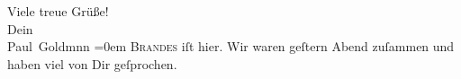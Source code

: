\begin{ledgroupsized}[t]{13cm}
           \pstart
           Viele treue Grüße! {\\[\baselineskip]}Dein {\\[\baselineskip]}\spacefill\mbox{Paul Goldmnn}\pend
           \leftskip=0em{}\pstart
           \noindent{}\textsc{Brandes} iſt hier. Wir waren
                     geſtern{ }Abend zuſammen und haben viel von Dir geſprochen.\pend
           
         
         \endnumbering{}\end{ledgroupsized}  \newcommand{\dateiname}{L02927}\newcommand{\titel}{Paul Goldmann an Arthur Schnitzler, 7. 8. [1900]}\newcommand{\editorInnen}{Martin Anton Müller und Laura Untner}
      